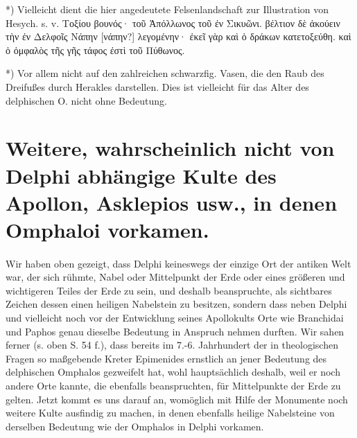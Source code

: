 \documentclass[a4paper, 11pt, oneside]{article}
\begin{document}
*) Vielleicht dient die hier angedeutete Felsenlandschaft zur Illustration von Hesych. s. v. Τοξίου βουνός· τοῦ Ἀπόλλωνος τοῦ ἐν Σικυῶνι. βέλτιον δὲ ἀκούειν τὴν ἐν Δελφοῖς Νάπην [νάπην?] λεγομένην· ἐκεῖ γὰρ καὶ ὁ δράκων κατετοξεύθη. καὶ ὁ ὀμφαλὸς τῆς γῆς τάφος ἐστὶ τοῦ Πύθωνος.

*) Vor allem nicht auf den zahlreichen schwarzfig. Vasen, die den Raub des Dreifußes durch Herakles darstellen. Dies ist vielleicht für das Alter des delphischen O. nicht ohne Bedeutung.
\clearpage
\section{Weitere, wahrscheinlich nicht von Delphi abhängige Kulte des Apollon, Asklepios usw., in denen Omphaloi vorkamen.}
\paragraph{}
Wir haben oben gezeigt, dass Delphi keineswegs der einzige Ort der antiken Welt war, der sich rühmte, Nabel oder Mittelpunkt der Erde oder eines größeren und wichtigeren Teiles der Erde zu sein, und deshalb beanspruchte, als sichtbares Zeichen dessen einen heiligen Nabelstein zu besitzen, sondern dass neben Delphi und vielleicht noch vor der Entwicklung seines Apollokults Orte wie Branchidai und Paphos genau dieselbe Bedeutung in Anspruch nehmen durften. Wir sahen ferner (s. oben S. 54 f.), dass bereits im 7.-6. Jahrhundert der in theologischen Fragen so maßgebende Kreter Epimenides ernstlich an jener Bedeutung des delphischen Omphalos gezweifelt hat, wohl hauptsächlich deshalb, weil er noch andere Orte kannte, die ebenfalls beanspruchten, für Mittelpunkte der Erde zu gelten. Jetzt kommt es uns darauf an, womöglich mit Hilfe der Monumente noch weitere Kulte ausfindig zu machen, in denen ebenfalls heilige Nabelsteine von derselben Bedeutung wie der Omphalos in Delphi vorkamen.
\end{document}
